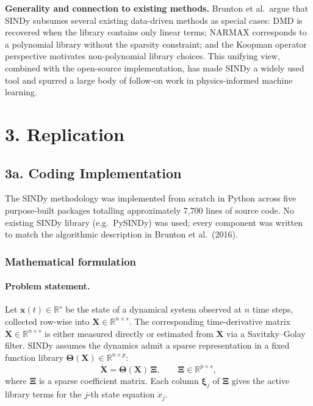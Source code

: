 \documentclass[12pt]{article}
\begin{document}
\textbf{Generality and connection to existing methods.}
Brunton et al.\ argue that SINDy subsumes several existing data-driven
methods as special cases: DMD is recovered when the library contains only
linear terms; NARMAX corresponds to a polynomial library without the
sparsity constraint; and the Koopman operator perspective motivates
non-polynomial library choices.  This unifying view, combined with the
open-source implementation, has made SINDy a widely used tool and spurred
a large body of follow-on work in physics-informed machine learning.

\section*{3. Replication}

\subsection*{3a. Coding Implementation}

The SINDy methodology was implemented from scratch in Python across five
purpose-built packages totalling approximately 7{,}700 lines of source code.
No existing SINDy library (e.g.\ PySINDy) was used; every component was
written to match the algorithmic description in Brunton et al.\ (2016).

\subsubsection*{Mathematical formulation}

\paragraph{Problem statement.}
Let $\mathbf{x}(t) \in \mathbb{R}^{s}$ be the state of a dynamical system
observed at $n$ time steps, collected row-wise into
$\mathbf{X} \in \mathbb{R}^{n \times s}$.  The corresponding time-derivative
matrix $\dot{\mathbf{X}} \in \mathbb{R}^{n \times s}$ is either measured
directly or estimated from $\mathbf{X}$ via a Savitzky--Golay filter.
SINDy assumes the dynamics admit a sparse representation in a fixed
function library $\boldsymbol{\Theta}(\mathbf{X}) \in \mathbb{R}^{n \times p}$:
\begin{equation}
  \dot{\mathbf{X}} = \boldsymbol{\Theta}(\mathbf{X})\,\boldsymbol{\Xi},
  \qquad \boldsymbol{\Xi} \in \mathbb{R}^{p \times s},
  \label{eq:sindy}
\end{equation}
where $\boldsymbol{\Xi}$ is a sparse coefficient matrix.  Each column
$\boldsymbol{\xi}_{j}$ of $\boldsymbol{\Xi}$ gives the active library
terms for the $j$-th state equation $\dot{x}_{j}$.
\end{document}

